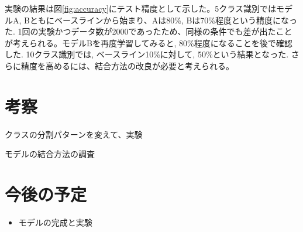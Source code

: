 \documentclass[twocolumn]{jarticle}     %
\begin{document}
実験の結果は図\ref{fig:accuracy}にテスト精度として示した。5クラス識別ではモデルA, Bともにベースラインから始まり、Aは80\%, Bは70\%程度という精度になった. 1回の実験かつデータ数が2000であったため、同様の条件でも差が出たことが考えられる。モデルBを再度学習してみると, 80\%程度になることを後で確認した.
10クラス識別では, ベースライン10\%に対して, 50\%という結果となった. さらに精度を高めるには、結合方法の改良が必要と考えられる。

\section{考察}
クラスの分割パターンを変えて、実験

モデルの結合方法の調査

\section{今後の予定}
\begin{itemize}
	\item {モデルの完成と実験}
\end{itemize}



\end{document}
